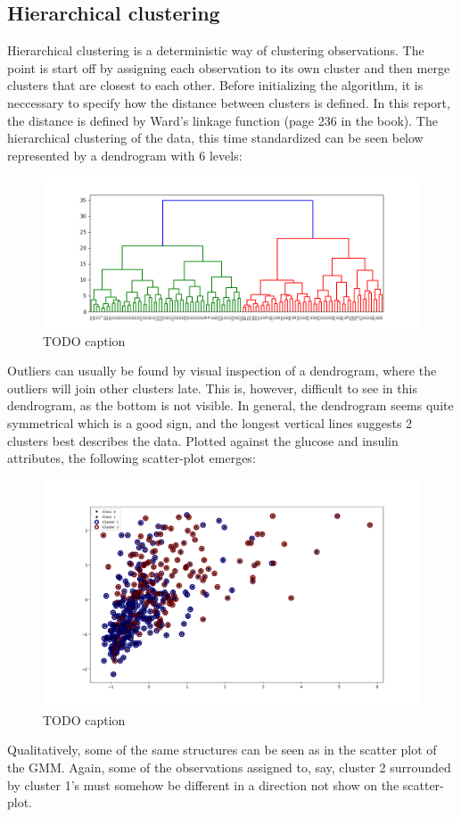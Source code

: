 \subsection{Hierarchical clustering}
Hierarchical clustering is a deterministic way of clustering observations. The
point is start off by assigning each observation to its own cluster and then
merge clusters that are closest to each other. Before initializing the algorithm,
it is neccessary to specify how the distance between clusters is defined. In this
report, the distance is defined by Ward's linkage function (page 236 in the
book). The hierarchical clustering of the data, this time standardized can be seen
below represented by a dendrogram with 6 levels:\\
\begin{figure}[htb]
  \centering
  \includegraphics[width=\textwidth]{Figure_3.png}
  \caption{TODO caption}
\end{figure}
Outliers can usually be found by visual inspection of a dendrogram, where the
outliers will join other clusters late. This is, however, difficult to see in
this dendrogram, as the bottom is not visible. In general, the dendrogram seems
quite symmetrical which is a good sign, and the longest vertical lines suggests
2 clusters best describes the data. Plotted against the glucose and insulin attributes,
the following scatter-plot emerges:\\
\begin{figure}[htb]
  \centering
  \includegraphics[width=\textwidth]{Figure_4.png}
  \caption{TODO caption}
\end{figure}
Qualitatively, some of the same structures can be seen as in the scatter plot
of the GMM. Again, some of the observations assigned to, say, cluster 2
surrounded by cluster 1's must somehow be different in a direction not show
on the scatter-plot.


